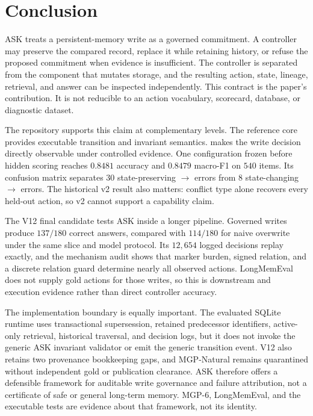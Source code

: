 \section{Conclusion}
\label{sec:conclusion}

ASK treats a persistent-memory write as a governed commitment. A controller may
preserve the compared record, replace it while retaining history, or refuse the
proposed commitment when evidence is insufficient. The controller is separated
from the component that mutates storage, and the resulting action, state,
lineage, retrieval, and answer can be inspected independently. This contract is
the paper's contribution. It is not reducible to an action vocabulary,
scorecard, database, or diagnostic dataset.

The repository supports this claim at complementary levels. The reference core
provides executable transition and invariant semantics. \mgpc{} makes the
write decision directly observable under controlled evidence. One configuration
frozen before hidden scoring reaches $0.8481$ accuracy and $0.8479$ macro-F1 on
$540$ items. Its confusion matrix separates $30$ state-preserving
\abstain$\to$\keep{} errors from $8$ state-changing
\abstain$\to$\supersede{} errors. The historical v2 result also matters:
conflict type alone recovers every held-out action, so v2 cannot support a
capability claim.

The \lme{} V12 final candidate tests ASK inside a longer pipeline. Governed
writes produce $137/180$ correct answers, compared with $114/180$ for naive
overwrite under the same slice and model protocol. Its $12{,}654$ logged
decisions replay exactly, and the mechanism audit shows that marker burden,
signed relation, and a discrete relation guard determine nearly all observed
actions. LongMemEval does not supply gold actions for those writes, so this is
downstream and execution evidence rather than direct controller accuracy.

The implementation boundary is equally important. The evaluated SQLite runtime
uses transactional supersession, retained predecessor identifiers, active-only
retrieval, historical traversal, and decision logs, but it does not invoke the
generic ASK invariant validator or emit the generic transition event. V12 also
retains two provenance bookkeeping gaps, and MGP-Natural remains quarantined
without independent gold or publication clearance. ASK therefore offers a
defensible framework for auditable write governance and failure attribution,
not a certificate of safe or general long-term memory. MGP-6, LongMemEval, and
the executable tests are evidence about that framework, not its identity.
